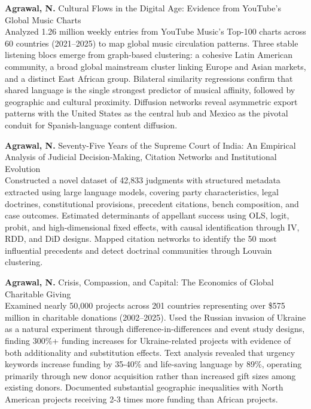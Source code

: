\documentclass[10pt,a4paper]{article}
\begin{document}
\textbf{Agrawal, N.} Cultural Flows in the Digital Age: Evidence from YouTube’s Global Music Charts\\
{\small Analyzed 1.26 million weekly entries from YouTube Music's Top-100 charts across 60 countries (2021--2025) to map global music circulation patterns. Three stable listening blocs emerge from graph-based clustering: a cohesive Latin American community, a broad global mainstream cluster linking Europe and Asian markets, and a distinct East African group. Bilateral similarity regressions confirm that shared language is the single strongest predictor of musical affinity, followed by geographic and cultural proximity. Diffusion networks reveal asymmetric export patterns with the United States as the central hub and Mexico as the pivotal conduit for Spanish-language content diffusion.}

\vspace{5pt}

\textbf{Agrawal, N.} Seventy-Five Years of the Supreme Court of
India: An Empirical Analysis of Judicial Decision-Making,
Citation Networks and Institutional
Evolution\\
{\small Constructed a novel dataset of 42,833 judgments with structured metadata extracted using large language models, covering party characteristics, legal doctrines, constitutional provisions, precedent citations, bench composition, and case outcomes. Estimated determinants of appellant success using OLS, logit, probit, and high-dimensional fixed effects, with causal identification through IV, RDD, and DiD designs. Mapped citation networks to identify the 50 most influential precedents and detect doctrinal communities through Louvain clustering.}

\vspace{5pt}

\textbf{Agrawal, N.} Crisis, Compassion, and Capital: The Economics of Global Charitable Giving \\
{\small Examined nearly 50,000 projects across 201 countries representing over \$575 million in charitable donations (2002--2025). Used the Russian invasion of Ukraine as a natural experiment through difference-in-differences and event study designs, finding 300\%+ funding increases for Ukraine-related projects with evidence of both additionality and substitution effects. Text analysis revealed that urgency keywords increase funding by 35-40\% and life-saving language by 89\%, operating primarily through new donor acquisition rather than increased gift sizes among existing donors. Documented substantial geographic inequalities with North American projects receiving 2-3 times more funding than African projects.}
\end{document}
